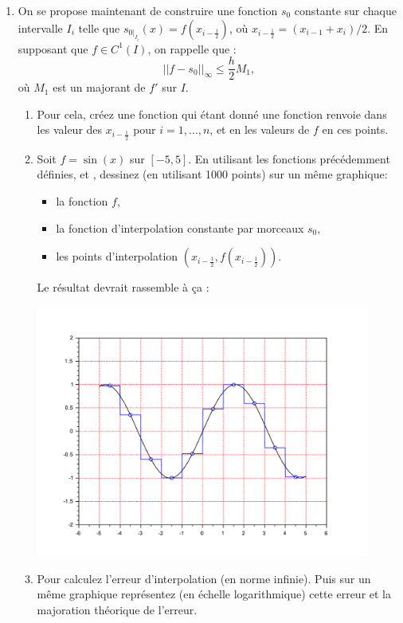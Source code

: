 \documentclass[a4paper,12pt,reqno]{amsart}
\begin{document}
\begin{exo}
\begin{enumerate}
    \item On se propose maintenant de construire une fonction $s_0$ constante sur chaque intervalle $I_i$ telle que $s_{0|_{I_i}}(x)=f(x_{i-\frac12})$, où $x_{i-\frac12}=(x_{i-1}+x_{i})/2$. En supposant que  $f \in C^1(I)$, on rappelle que :
      \[
        ||f-s_0||_{\infty}\leq \frac{h}{2} M_1,
      \]
    où $M_1$ est un majorant de $f'$ sur $I$.
    \begin{enumerate}
      \item Pour cela, créez une fonction  qui étant donné une fonction  renvoie dans  les valeur des $x_{i-\frac12}$ pour $i=1,\ldots,n$, et en  les valeurs de $f$ en ces points.

      \item Soit $f=\sin(x)$ sur $[-5,5]$. En utilisant les fonctions précédemment définies,  et , dessinez (en utilisant 1000 points) sur un même graphique:
      \begin{itemize}
        \item la fonction $f$,
        \item la fonction d'interpolation constante par morceaux $s_{0}$,
        \item les points d'interpolation $(x_{i-\frac12},f(x_{i-\frac12}))$.
      \end{itemize}
      Le résultat devrait rassemble à ça :
      \begin{center}
        \includegraphics[width=11cm]{SciLab_test_interp_constante}
      \end{center}

      \item Pour  calculez l'erreur d'interpolation (en norme infinie). Puis sur un même graphique représentez (en échelle logarithmique) cette erreur et la majoration théorique de l'erreur.
    \end{enumerate}
  \end{enumerate}
\end{exo}
\end{document}
